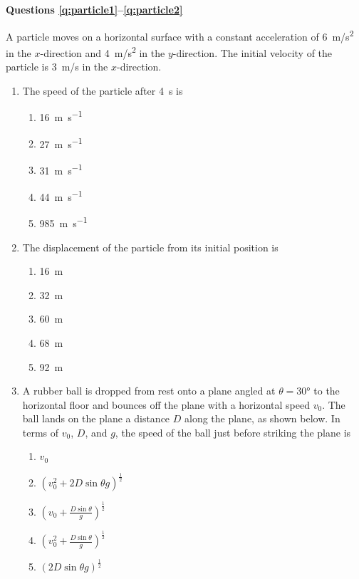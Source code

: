 \documentclass{../../../oss-classkick}
\begin{document}
\begin{multicols*}{2}
  \textbf{Questions \ref{q:particle1}--\ref{q:particle2}}

  A particle moves on a horizontal surface with a constant acceleration of
  \SI{6}{m/s^2} in the $x$-direction and \SI{4}{m/s^2} in the $y$-direction. The
  initial velocity of the particle is \SI{3}{m/s} in the $x$-direction.
  
  \begin{enumerate}[resume,leftmargin=18pt]
  \item The speed of the particle after \SI{4}{\second} is
    \begin{enumerate}[nosep,leftmargin=18pt,label=(\Alph*)]
    \item\SI{16 }{\metre\per\second}
    \item\SI{27 }{\metre\per\second}
    \item\SI{31 }{\metre\per\second}
    \item\SI{44 }{\metre\per\second}
    \item\SI{985}{\metre\per\second}
    \end{enumerate}
    \label{q:particle1}
    
  \item The displacement of the particle from its initial position is
    \begin{enumerate}[nosep,leftmargin=18pt,label=(\Alph*)]
    \item\SI{16}{\metre}
    \item\SI{32}{\metre}
    \item\SI{60}{\metre}
    \item\SI{68}{\metre}
    \item\SI{92}{\metre}
    \end{enumerate}
    \label{q:particle2}
    
  \item A rubber ball is dropped from rest onto a plane angled at
    $\theta=\ang{30}$ to
    the horizontal floor and bounces off the plane with a horizontal speed
    $v_0$. The ball lands on the plane a distance $D$ along the plane, as shown
    below. In terms of $v_0$, $D$, and $g$, the speed of the ball just before
    striking the plane is
    \begin{enumerate}[nosep,leftmargin=18pt,label=(\Alph*)]
    \item $v_0$
    \item $\displaystyle\left(v_0^2+2D\sin\theta g\right)^\frac{1}{2}$
    \item $\displaystyle\left(v_0+\frac{D\sin\theta}{g}\right)^\frac{1}{2}$
    \item $\displaystyle\left(v_0^2+\frac{D\sin\theta}{g}\right)^\frac{1}{2}$
    \item $\displaystyle\left(2D\sin\theta g\right)^\frac{1}{2}$
    \end{enumerate}
    \vspace{.7in}
    

\end{enumerate}
\end{multicols*}
\end{document}
